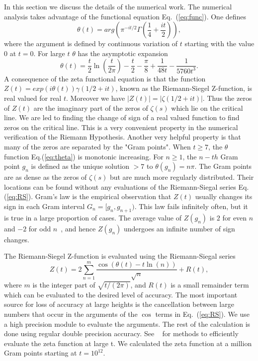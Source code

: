 \documentclass[twoside]{article}
\begin{document}
In this section we discuss the details of the numerical work. 
The numerical analysis takes advantage of the functional 
equation Eq.~(\ref{eq:func}).
One defines
\begin{equation}
\theta(t) = arg (\pi^{−it/2} \Gamma(\frac{1}{4} + \frac{it}{2})), 
\label{eq:theta}
\end{equation}
where the argument is defined by continuous variation of $t$ starting with the value $0$ at $t = 0$.
For large $t$ $\theta$ has the asymptotic expansion
\begin{equation}
\theta(t) = \frac{t}{2}\ln (\frac{t}{2\pi}) - \frac{t}{2} - \frac{\pi}{8} + \frac{1}{48t} - \frac{1}{5760t^3}. 
\label{eq:thetaAsymptotic}
\end{equation}
A consequence of the zeta functional equation is that the function 
$Z(t)=exp(i\theta(t))\gamma(1/2 +it)$,
known as the Riemann-Siegel Z-function, is real valued for real $t$. 
Moreover we have $|Z(t)| = |\zeta(1/2+it)|$. Thus the zeros of $Z(t)$ are the imaginary part of the zeros 
of $\zeta(s)$ which lie on the critical line. We are led to finding the change of sign 
of a real valued function 
to find zeros on the critical line. This is a very convenient property in the numerical verification 
of the Riemann Hypothesis.
Another very helpful property is that many of the zeros are separated by the
"Gram points".  When $t \ge 7$, the $\theta$ function Eq.(\ref{eq:theta}) is monotonic increasing. 
For $n \ge 1$, the $n-th$ Gram point $g_n$ is defined as the unique solution $> 7$ to
$\theta (g_n) = n\pi$.
The Gram points are as dense as the zeros of $\zeta(s)$ but are much more regularly distributed.
Their locations can be found without any evaluations of the Riemann-Siegal series Eq.(\ref{eq:RS}).
Gram's law is the empirical observation that $Z(t)$ usually changes its sign in each Gram interval 
$G_n = [g_n,g_{n+1})$. 
This law fails infinitely often, but it is true in a large proportion of cases.
The average value of $Z(g_n)$ is $2$ for even $n$ and $-2$ for odd $n$~\cite{Titchmarsh(1986)},
and hence $Z(g_n)$ undergoes an infinite number of sign changes.


The Riemann-Siegel Z-function is evaluated using the Riemann-Siegal series
\begin{equation}
Z(t) = 2\sum^{m}_{n=1}\frac{\cos(\theta(t) - t \ln (n))}{\sqrt{n}} + R(t), 
\label{eq:RS}
\end{equation}
where $m$ is the integer part of $\sqrt{t/(2\pi)}$, and $R(t)$ is a small remainder
term which can be evaluated to the desired level of accuracy. The most important 
source for loss of accuracy at large heights is the cancellation between
large numbers that occur in the arguments of the $\cos$ terms in Eq.~(\ref{eq:RS}). We 
use a high precision module to evaluate the arguments. The rest of the calculation
is done using regular double precision accuracy. See ~\cite{hiary,gourdon,Odlyzko(1989)} for methods to efficiently evaluate the zeta function at large t.
We calculated the zeta function at a million Gram points starting at $t = 10^{12}$.
\end{document}

